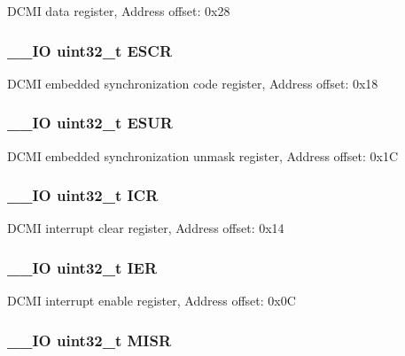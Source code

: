 D\-C\-M\-I data register, Address offset\-: 0x28 \hypertarget{struct_d_c_m_i___type_def_a9cc4ec74be864c929261e0810f2fd7f0}{
\subsubsection[{E\-S\-C\-R}]{\setlength{\rightskip}{0pt plus 5cm}\-\_\-\-\_\-\-I\-O uint32\-\_\-t E\-S\-C\-R}}\label{struct_d_c_m_i___type_def_a9cc4ec74be864c929261e0810f2fd7f0}
D\-C\-M\-I embedded synchronization code register, Address offset\-: 0x18 \hypertarget{struct_d_c_m_i___type_def_af751d49ef824c1636c78822ecae066f4}{
\subsubsection[{E\-S\-U\-R}]{\setlength{\rightskip}{0pt plus 5cm}\-\_\-\-\_\-\-I\-O uint32\-\_\-t E\-S\-U\-R}}\label{struct_d_c_m_i___type_def_af751d49ef824c1636c78822ecae066f4}
D\-C\-M\-I embedded synchronization unmask register, Address offset\-: 0x1\-C \hypertarget{struct_d_c_m_i___type_def_a0a8c8230846fd8ff154b9fde8dfa0399}{
\subsubsection[{I\-C\-R}]{\setlength{\rightskip}{0pt plus 5cm}\-\_\-\-\_\-\-I\-O uint32\-\_\-t I\-C\-R}}\label{struct_d_c_m_i___type_def_a0a8c8230846fd8ff154b9fde8dfa0399}
D\-C\-M\-I interrupt clear register, Address offset\-: 0x14 \hypertarget{struct_d_c_m_i___type_def_a6566f8cfbd1d8aa7e8db046aa35e77db}{
\subsubsection[{I\-E\-R}]{\setlength{\rightskip}{0pt plus 5cm}\-\_\-\-\_\-\-I\-O uint32\-\_\-t I\-E\-R}}\label{struct_d_c_m_i___type_def_a6566f8cfbd1d8aa7e8db046aa35e77db}
D\-C\-M\-I interrupt enable register, Address offset\-: 0x0\-C \hypertarget{struct_d_c_m_i___type_def_a524e134cec519206cb41d0545e382978}{
\subsubsection[{M\-I\-S\-R}]{\setlength{\rightskip}{0pt plus 5cm}\-\_\-\-\_\-\-I\-O uint32\-\_\-t M\-I\-S\-R}}\label{struct_d_c_m_i___type_def_a524e134cec519206cb41d0545e382978}
